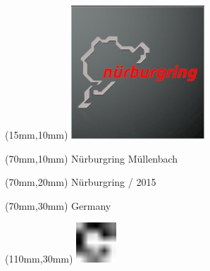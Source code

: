 \null\newpage
\begin{textblock*}{50mm}(15mm,10mm)%
\includegraphics[width=50mm]{LG/2015-05-20_00089.png}
\end{textblock*}
\begin{textblock*}{130mm}(70mm,10mm)%
{\fontsize{20}{20}\selectfont Nürburgring Müllenbach}\\
\end{textblock*}
\begin{textblock*}{120mm}(70mm,20mm)%
{\fontsize{16}{16}\selectfont Nürburgring / 2015}\\
\end{textblock*}
\begin{textblock*}{120mm}(70mm,30mm)%
{\fontsize{12}{12}\selectfont Germany}
\end{textblock*}
\begin{textblock*}{30mm}(110mm,30mm)%
\centering
\includegraphics[height=15mm]{icons/fa-rotate-right.pdf}
\end{textblock*}
